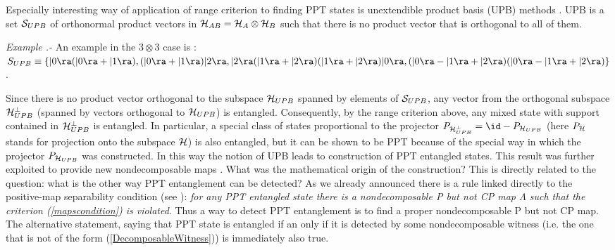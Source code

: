 \documentclass[twocolumn,aps,rmp]{revtex4}
\begin{document}
Especially interesting way of application of range criterion to
finding PPT states is unextendible product basis (UPB) methods
\cite{BennettUPBI1999,UPB2}. UPB is a set ${\cal S}_{UPB}$ of
orthonormal product vectors in ${\cal H}_{AB}={\cal H}_{A} \otimes
{\cal H}_{B}$ such that there is no product vector that is orthogonal
to all of them.

{\it Example .-} An example in the $3 \otimes 3$ case is
\cite{BennettUPBI1999}: $S_{UPB} \equiv \{ |0\ra(|0\ra +|1\ra),
(|0\ra+|1\ra)|2\ra, |2\ra(|1\ra+|2\ra) (|1\ra+|2\ra)|0\ra, (|0\ra-|
1\ra +|2\ra)(|0\ra-|1\ra+|2\ra) \}$.

Since there is no product vector orthogonal to the subspace ${\cal
  H}_{UPB}$ spanned by elements of ${\cal S}_{UPB}$, any vector from
the orthogonal subspace ${\cal H}_{UPB}^{\perp}$ (spanned by vectors
orthogonal to ${\cal H}_{UPB}$) is entangled. Consequently, by the
range criterion above, any mixed state with support contained in
${\cal H}_{UPB}^{\perp}$ is entangled. In particular, a special class
of states proportional to the projector $P_{{\cal
    H}_{UPB}^{\perp}}=\id - P_{{\cal H}_{UPB}}$ (here $P_{{\cal H}}$
stands for projection onto the subspace ${\cal H}$) is also entangled,
but it can be shown to be PPT because of the special way in which the
projector $P_{{\cal H}_{UPB}}$ was constructed. In this way the notion
of UPB leads to construction of PPT entangled states.  This result was
further exploited to provide new nondecomposable maps
\cite{Terhal2000-laa}. What was the mathematical origin of the
construction? This is directly related to the question: what is the
other way PPT entanglement can be detected? As we already announced
there is a rule linked directly to the positive-map separability
condition (see \cite{sep1996}): {\it for any PPT entangled state there
  is a nondecomposable P but not CP map $\Lambda$ such that the
  criterion (\ref{mapscondition}) is violated}. Thus a way to detect
PPT entanglement is to find a proper nondecomposable P but not CP
map. The alternative statement, saying that PPT state is entangled if
an only if it is detected by some nondecomposable witness (i.e. the
one that is not of the form (\ref{DecomposableWitness})) is
immediately also true.
\end{document}
